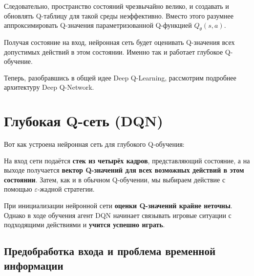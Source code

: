 \documentclass[11pt,a4paper]{article}
\begin{document}

Следовательно, пространство состояний чрезвычайно велико, и создавать и обновлять Q-таблицу для такой среды неэффективно. Вместо этого разумнее аппроксимировать Q-значения параметризованной Q-функцией \(Q_{\theta}(s,a)\).

Получая состояние на вход, нейронная сеть будет оценивать Q-значения всех допустимых действий в этом состоянии. Именно так и работает глубокое Q-обучение.


Теперь, разобравшись в общей идее Deep Q-Learning, рассмотрим подробнее архитектуру Deep Q-Network.

\section{Глубокая Q-сеть (DQN)}\label{the-deep-q-network-dqn}

Вот как устроена нейронная сеть для глубокого Q-обучения:


На вход сети подаётся \textbf{стек из четырёх кадров}, представляющий состояние, а на выходе получается \textbf{вектор Q-значений для всех возможных действий в этом состоянии}. Затем, как и в обычном Q-обучении, мы выбираем действие с помощью \(\varepsilon\)-жадной стратегии.

При инициализации нейронной сети \textbf{оценки Q-значений крайне неточны}. Однако в ходе обучения агент DQN начинает связывать игровые ситуации с подходящими действиями и \textbf{учится успешно играть}.

\subsection{Предобработка входа и проблема временной информации}\label{preprocessing-the-input-and-temporal-limitation}
\end{document}
